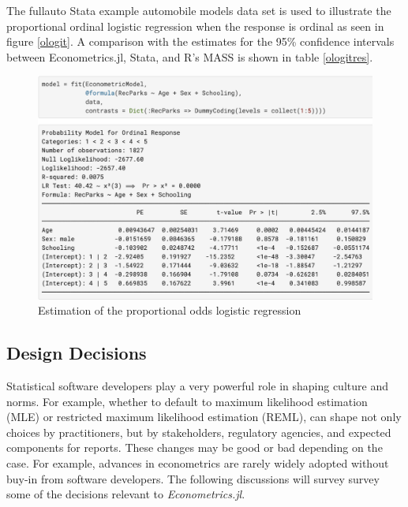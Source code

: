 \documentclass{juliacon}
\begin{document}
The fullauto Stata example automobile models data set is used to illustrate the proportional ordinal logistic regression when the response is ordinal as seen in figure \vref{ologit}. A comparison with the estimates for the 95\% confidence intervals between Econometrics.jl, Stata, and R's MASS is shown in table \vref{ologitres}.

\begin{figure}[hbpt]
	\includegraphics[max width=\linewidth,center]{estimator_ologit}
	\caption{Estimation of the proportional odds logistic regression}
	\label{ologit}
\end{figure}

\subsection{Design Decisions}

Statistical software developers play a very powerful role in shaping culture and norms. For example, whether to default to maximum likelihood estimation (MLE) or restricted maximum likelihood estimation (REML), can shape not only choices by practitioners, but by stakeholders, regulatory agencies, and expected components for reports. These changes may be good or bad depending on the case. For example, advances in econometrics are rarely widely adopted without buy-in from software developers. The following discussions will survey survey some of the decisions relevant to \textit{Econometrics.jl}.
\end{document}
